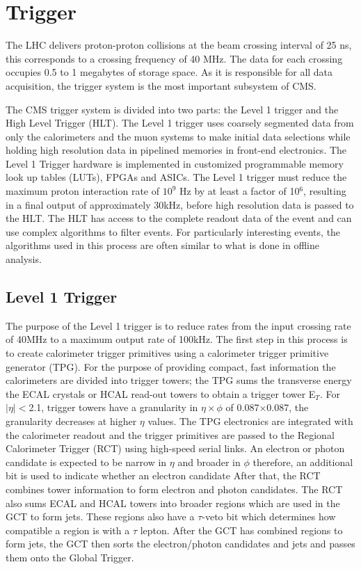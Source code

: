 \section{Trigger}%
The LHC delivers proton-proton collisions at the beam crossing 
interval of 25 ns, this corresponds to a crossing frequency of 40 MHz.
The data for each crossing occupies 0.5 to 1 megabytes of storage space.
As it is responsible for all data acquisition, 
the trigger system is the most important subsystem of CMS. 

The CMS trigger system is divided into two parts: the Level 1 trigger 
and the High Level Trigger (HLT). 
The Level 1 trigger uses coarsely segmented
data from only the calorimeters and the muon systems to make initial
data selections while holding high resolution data in pipelined memories
in front-end electronics. The Level 1 Trigger hardware is implemented in customized
programmable memory look up tables (LUTs), FPGAs and ASICs.
The Level 1 trigger must reduce the maximum proton interaction rate of $10^{9}$ Hz 
by at least a factor of 10$^{6}$, 
resulting in a final output of approximately 30kHz,
before high resolution data is passed to the HLT.
The HLT has access to the complete readout data of the event and can use
complex algorithms to filter events. For particularly interesting events, 
the algorithms used in this process are often similar to what is done in 
offline analysis. 
  \subsection{Level 1 Trigger} %
The purpose of the Level 1 trigger is to reduce rates from the input
crossing rate of 40MHz to a maximum output rate of 100kHz. 
The first step in this process is to create
calorimeter trigger primitives using a calorimeter trigger primitive generator (TPG).
For the purpose of providing compact, fast information the calorimeters
are divided into trigger towers; the TPG sums the transverse energy the
ECAL crystals or HCAL read-out towers to obtain a trigger tower E$_{T}$.
For $|\eta|<$2.1, trigger towers have a granularity
in $\eta \times \phi$ of 0.087$\times$0.087, the granularity decreases at higher
$\eta$ values. 
The TPG electronics are integrated with the calorimeter readout and the trigger primitives
are passed to the Regional Calorimeter Trigger (RCT) using
high-speed serial links.
An electron or photon candidate is expected to be narrow in $\eta$
and broader in $\phi$ therefore, an additional bit is used to indicate whether 
an electron candidate  
After that, the RCT combines tower information to form electron and 
photon candidates. The RCT also sums ECAL and HCAL towers into broader
regions which are used in the GCT to form jets. These regions also have a 
$\tau$-veto bit which determines how compatible a region is with a
$\tau$ lepton. After the GCT has combined regions to form jets, the GCT
then sorts the electron/photon candidates and jets and passes them onto
the Global Trigger.

